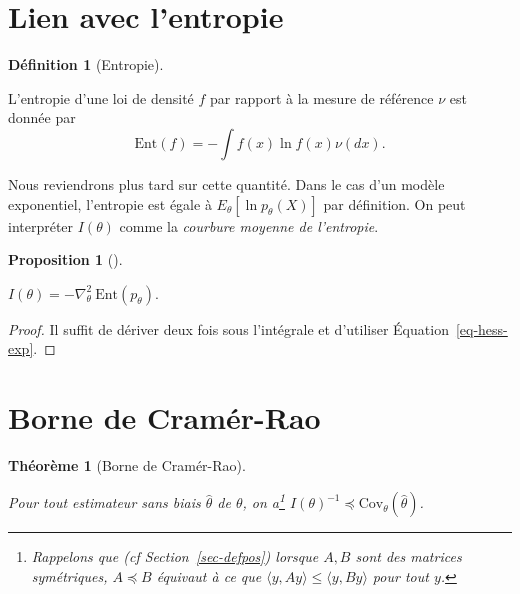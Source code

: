 \documentclass[
  10,
  letterpaper,
  DIV=11,
  numbers=noendperiod]{scrreport}
\theoremstyle{plain}
\newtheorem{theorem}{Théorème}[chapter]
\theoremstyle{definition}
\theoremstyle{plain}
\newtheorem{proposition}{Proposition}[chapter]
\theoremstyle{definition}
\newtheorem{definition}{Définition}[chapter]
\theoremstyle{definition}
\theoremstyle{plain}
\theoremstyle{remark}
\begin{document}
\hypertarget{lien-avec-lentropie}{%
\section{Lien avec l'entropie}\label{lien-avec-lentropie}}

\begin{definition}[Entropie]\protect\hypertarget{def-entropie}{}\label{def-entropie}

L'entropie d'une loi de densité \(f\) par rapport à la mesure de
référence \(\nu\) est donnée par
\[\mathrm{Ent}(f) = -\int f(x)\ln f(x)\nu(dx). \]

\end{definition}

Nous reviendrons plus tard sur cette quantité. Dans le cas d'un modèle
exponentiel, l'entropie est égale à \(E_\theta[\ln p_\theta(X)]\) par
définition. On peut interpréter \(I(\theta)\) comme la \emph{courbure
moyenne de l'entropie}.

\begin{proposition}[]\protect\hypertarget{prp-courbure}{}\label{prp-courbure}

\(I(\theta) = - \nabla^2_\theta~ \mathrm{Ent}(p_\theta).\)

\end{proposition}

\begin{proof}

Il suffit de dériver deux fois sous l'intégrale et d'utiliser
Équation~\ref{eq-hess-exp}.

\end{proof}

\hypertarget{borne-de-cramuxe9r-rao}{%
\section{Borne de Cramér-Rao}\label{borne-de-cramuxe9r-rao}}

\begin{theorem}[Borne de
Cramér-Rao]\protect\hypertarget{thm-cramer-rao}{}\label{thm-cramer-rao}

Pour tout estimateur sans biais \(\hat{\theta}\) de \(\theta\), on
a\footnote{Rappelons que (cf Section~\ref{sec-defpos}) lorsque \(A,B\)
  sont des matrices symétriques, \(A \preceq B\) équivaut à ce que
  \(\langle y, Ay\rangle \leqslant \langle y, By\rangle\) pour tout
  \(y\).} \(I(\theta)^{-1} \preceq \mathrm{Cov}_\theta(\hat{\theta})\).

\end{theorem}
\end{document}
